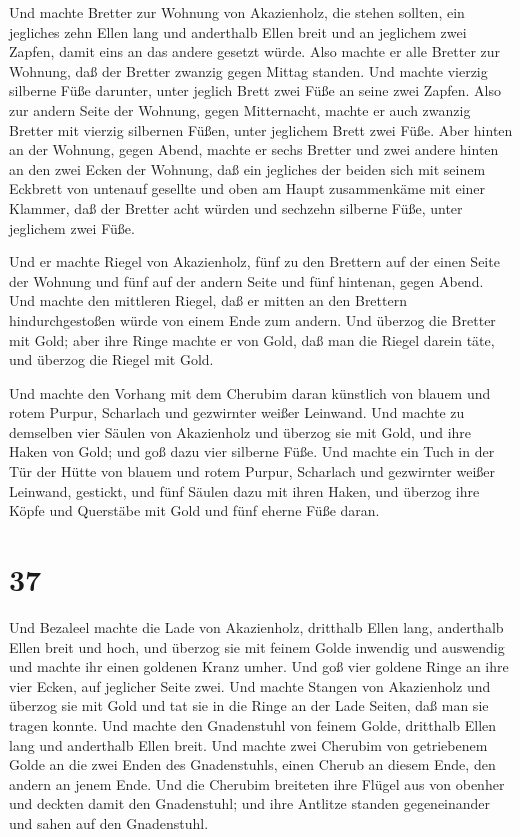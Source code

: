  Und machte Bretter zur Wohnung von Akazienholz, die stehen
sollten,  ein jegliches zehn Ellen lang und anderthalb
Ellen breit  und an jeglichem zwei Zapfen, damit eins an
das andere gesetzt würde. Also machte er alle Bretter zur Wohnung,
 daß der Bretter zwanzig gegen Mittag standen.
 Und machte vierzig silberne Füße darunter, unter jeglich
Brett zwei Füße an seine zwei Zapfen.  Also zur andern
Seite der Wohnung, gegen Mitternacht, machte er auch zwanzig Bretter
 mit vierzig silbernen Füßen, unter jeglichem Brett zwei
Füße.  Aber hinten an der Wohnung, gegen Abend, machte er
sechs Bretter  und zwei andere hinten an den zwei Ecken der
Wohnung,  daß ein jegliches der beiden sich mit seinem
Eckbrett von untenauf gesellte und oben am Haupt zusammenkäme mit einer
Klammer,  daß der Bretter acht würden und sechzehn silberne
Füße, unter jeglichem zwei Füße.

 Und er machte Riegel von Akazienholz, fünf zu den Brettern
auf der einen Seite der Wohnung  und fünf auf der andern
Seite und fünf hintenan, gegen Abend.  Und machte den
mittleren Riegel, daß er mitten an den Brettern hindurchgestoßen würde
von einem Ende zum andern.  Und überzog die Bretter mit
Gold; aber ihre Ringe machte er von Gold, daß man die Riegel darein
täte, und überzog die Riegel mit Gold.

 Und machte den Vorhang mit dem Cherubim daran künstlich
von blauem und rotem Purpur, Scharlach und gezwirnter weißer Leinwand.
 Und machte zu demselben vier Säulen von Akazienholz und
überzog sie mit Gold, und ihre Haken von Gold; und goß dazu vier
silberne Füße.  Und machte ein Tuch in der Tür der Hütte
von blauem und rotem Purpur, Scharlach und gezwirnter weißer Leinwand,
gestickt,  und fünf Säulen dazu mit ihren Haken, und
überzog ihre Köpfe und Querstäbe mit Gold und fünf eherne Füße daran.

\hypertarget{section-36}{%
\section{37}\label{section-36}}

 Und Bezaleel machte die Lade von Akazienholz, dritthalb
Ellen lang, anderthalb Ellen breit und hoch,  und überzog
sie mit feinem Golde inwendig und auswendig und machte ihr einen
goldenen Kranz umher.  Und goß vier goldene Ringe an ihre
vier Ecken, auf jeglicher Seite zwei.  Und machte Stangen
von Akazienholz und überzog sie mit Gold  und tat sie in die
Ringe an der Lade Seiten, daß man sie tragen konnte.  Und
machte den Gnadenstuhl von feinem Golde, dritthalb Ellen lang und
anderthalb Ellen breit.  Und machte zwei Cherubim von
getriebenem Golde an die zwei Enden des Gnadenstuhls,  einen
Cherub an diesem Ende, den andern an jenem Ende.  Und die
Cherubim breiteten ihre Flügel aus von obenher und deckten damit den
Gnadenstuhl; und ihre Antlitze standen gegeneinander und sahen auf den
Gnadenstuhl.

